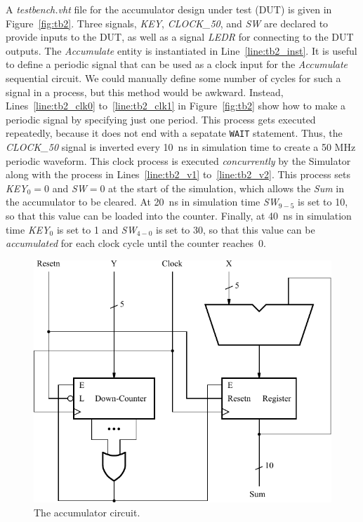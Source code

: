 \documentclass[11pt, twoside, pdftex]{article}
\begin{document}
\noindent
A {\it testbench.vht} file for the accumulator design under test (DUT) is given in 
Figure~\ref{fig:tb2}. Three signals, {\it KEY}, {\it CLOCK\_50}, and 
{\it SW} are declared to provide inputs to the DUT, as well as a signal {\it LEDR}
for connecting to the DUT outputs. The {\it Accumulate} entity is instantiated in
Line~\ref{line:tb2_inst}.
It is useful to define a periodic signal that can be used as a clock input for 
the {\it Accumulate} sequential circuit. We could manually define some number of cycles 
for such a signal in a process, but this method would be
awkward. Instead, Lines~\ref{line:tb2_clk0} to~\ref{line:tb2_clk1} in 
Figure~\ref{fig:tb2} show how to make a periodic signal by specifying just one period. 
This process gets executed repeatedly, because it does not end with a sepatate 
\texttt{WAIT} statement.  Thus, the {\it CLOCK\_50} signal is inverted
every 10~ns in simulation time to create a 50 MHz periodic waveform. This clock 
process is executed {\it concurrently} by the Simulator along with the process in
Lines~\ref{line:tb2_v1} to~\ref{line:tb2_v2}. This process sets 
{\it KEY}$_0 = 0$ and {\it SW}$=0$
at the start of the simulation, which allows the {\it Sum} in the accumulator to be
cleared. At 20~ns in simulation time {\it SW}$_{9-5}$ is set to 10, so that this value can 
be loaded into the counter. Finally, at 40~ns in simulation time {\it KEY}$_0$
is set to 1 and {\it SW}$_{4-0}$ is set to 30, so that this value can be
{\it accumulated} for each clock cycle until the counter reaches~0.

\begin{figure}[h!]
	\begin{center}
		\includegraphics[scale = 1.0]{figures/figaccum.pdf}
	\end{center}
		  \caption{The accumulator circuit.}
	\label{fig:circuit}
\end{figure}
\end{document}
